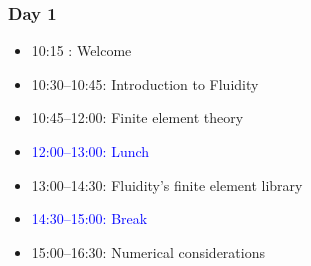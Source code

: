 
\begin{frame}
  \frametitle{Day 1}
  \begin{itemize}[]
  \item[] 10:15      : Welcome
  \item[] 10:30--10:45: Introduction to Fluidity
  \item[] 10:45--12:00: Finite element theory
  \item[] \textcolor{blue}{12:00--13:00: Lunch}
  \item[] 13:00--14:30: Fluidity's finite element library
  \item[] \textcolor{blue}{14:30--15:00: Break}
  \item[] 15:00--16:30: Numerical considerations
  \end{itemize}
\end{frame}
